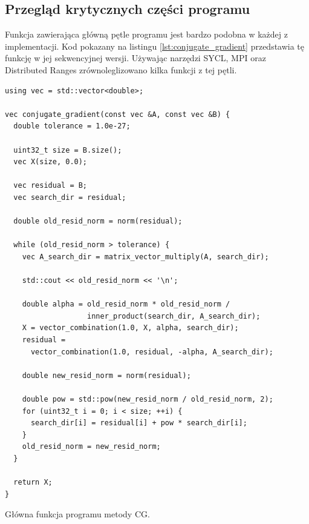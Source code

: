 \documentclass[a4paper,12pt]{book} %
\begin{document}
\subsection{Przegląd krytycznych części programu}
Funkcja zawierająca główną pętle programu jest bardzo podobna w każdej z implementacji. Kod pokazany na listingu \ref{lst:conjugate_gradient} przedstawia tę funkcję w jej sekwencyjnej wersji. Używając narzędzi SYCL, MPI oraz Distributed Ranges zrównoleglizowano kilka funkcji z tej pętli.

\begin{lstfloat}
\lstset{language=C++}
\begin{lstlisting}[frame=single]
using vec = std::vector<double>;

vec conjugate_gradient(const vec &A, const vec &B) {
  double tolerance = 1.0e-27;

  uint32_t size = B.size();
  vec X(size, 0.0);

  vec residual = B;
  vec search_dir = residual;

  double old_resid_norm = norm(residual);

  while (old_resid_norm > tolerance) {
    vec A_search_dir = matrix_vector_multiply(A, search_dir);

    std::cout << old_resid_norm << '\n';

    double alpha = old_resid_norm * old_resid_norm /
                   inner_product(search_dir, A_search_dir);
    X = vector_combination(1.0, X, alpha, search_dir);
    residual = 
	  vector_combination(1.0, residual, -alpha, A_search_dir);

    double new_resid_norm = norm(residual);

    double pow = std::pow(new_resid_norm / old_resid_norm, 2);
    for (uint32_t i = 0; i < size; ++i) {
      search_dir[i] = residual[i] + pow * search_dir[i];
    }
    old_resid_norm = new_resid_norm;
  }

  return X;
}
\end{lstlisting}
\caption{Główna funkcja programu metody CG.}
\label{lst:conjugate_gradient}
\end{lstfloat}
\end{document}
